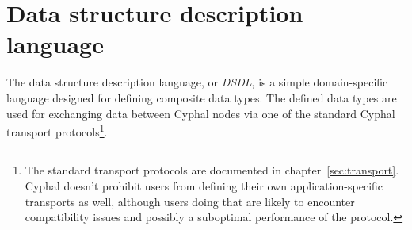 \chapter{Data structure description language}\label{sec:dsdl}

The data structure description language, or \emph{DSDL}, is a simple domain-specific language designed for
defining composite data types.
The defined data types are used for exchanging data between Cyphal nodes via one of the standard Cyphal
transport protocols\footnote{The standard transport protocols are documented in chapter~\ref{sec:transport}.
Cyphal doesn't prohibit users from defining their own application-specific transports as well,
although users doing that are likely to encounter compatibility issues and possibly a suboptimal
performance of the protocol.}.










